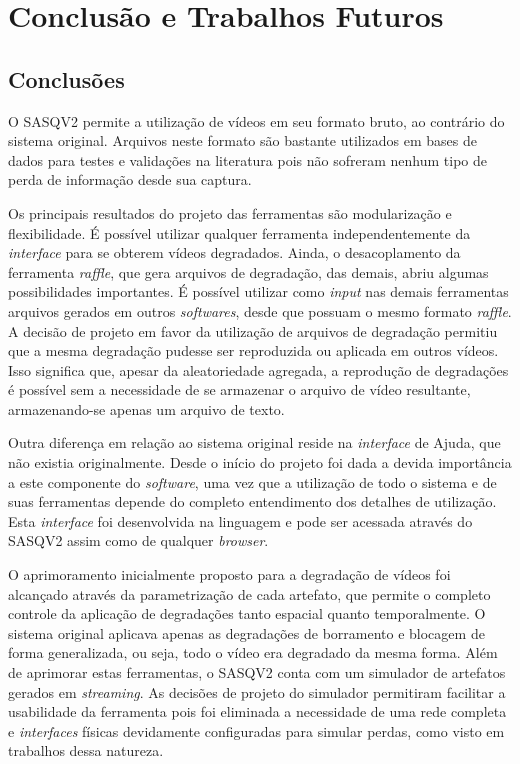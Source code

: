 
\chapter{Conclusão e Trabalhos Futuros}




\section{Conclusões}

O SASQV2 permite a utilização de vídeos em seu formato bruto, ao contrário do sistema original. Arquivos neste formato são bastante utilizados em bases de dados para testes e validações na literatura pois não sofreram nenhum tipo de perda de informação desde sua captura.

Os  principais resultados do projeto das ferramentas são modularização e flexibilidade. É possível utilizar qualquer ferramenta independentemente da \emph{interface} para se obterem vídeos degradados. Ainda, o desacoplamento da ferramenta \emph{raffle}, que gera arquivos de degradação, das demais, abriu algumas possibilidades importantes. É possível utilizar como \emph{input} nas demais ferramentas arquivos gerados em outros \emph{softwares}, desde que possuam o mesmo formato \emph{raffle}. A decisão de projeto em favor da utilização de arquivos de degradação permitiu que a mesma degradação pudesse ser reproduzida ou aplicada em outros vídeos. Isso significa que, apesar da aleatoriedade agregada, a reprodução de degradações é possível sem a necessidade de se armazenar o arquivo de vídeo resultante, armazenando-se apenas um arquivo de texto. 

Outra diferença em relação ao sistema original reside na \emph{interface} de Ajuda, que não existia originalmente. Desde o início do projeto foi dada a devida importância a este componente do \emph{software}, uma vez que a utilização de todo o sistema e de suas ferramentas depende do completo entendimento dos detalhes de utilização. Esta \emph{interface} foi desenvolvida na linguagem  e pode ser acessada através do SASQV2 assim como de qualquer \emph{browser}.

O aprimoramento inicialmente proposto para a degradação de vídeos foi alcançado através da parametrização de cada artefato, que permite o completo controle da aplicação de degradações tanto espacial quanto temporalmente. O sistema original aplicava apenas as degradações de borramento e blocagem de forma generalizada, ou seja, todo o vídeo era degradado da mesma forma. Além de aprimorar estas ferramentas, o SASQV2 conta com um simulador de artefatos gerados em \emph{streaming}. As decisões de projeto do simulador permitiram facilitar a usabilidade da ferramenta pois foi eliminada a necessidade de uma rede completa e \emph{interfaces} físicas devidamente configuradas para simular perdas, como visto em trabalhos dessa natureza.

